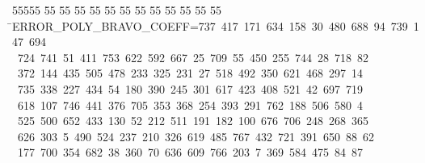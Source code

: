%
%
\begin{tabbing}
55555 \= 55 \= 55 \= 55 \= 55 \= 55 \= 55 \= 55 \= 55 \= 55 \= 55 \= 55 \= 55 \= \>ERROR\_POLY\_BRAVO\_COEFF=737\ 417\ 171\ 634\ 158\ 30\ 480\ 688\ 94\ 739\ 147\ 694\\[0pt]
\>\ 724\ 741\ 51\ 411\ 753\ 622\ 592\ 667\ 25\ 709\ 55\ 450\ 255\ 744\ 28\ 718\ 82\ \\[0pt]
\ 372\ 144\ 435\ 505\ 478\ 233\ 325\ 231\ 27\ 518\ 492\ 350\ 621\ 468\ 297\ 14\\[0pt]
\ 735\ 338\ 227\ 434\ 54\ 180\ 390\ 245\ 301\ 617\ 423\ 408\ 521\ 42\ 697\ 719\ \\[0pt]
\ 618\ 107\ 746\ 441\ 376\ 705\ 353\ 368\ 254\ 393\ 291\ 762\ 188\ 506\ 580\ 4\\[0pt]
\ 525\ 500\ 652\ 433\ 130\ 52\ 212\ 511\ 191\ 182\ 100\ 676\ 706\ 248\ 268\ 365\\[0pt]
\>\ 626\ 303\ 5\ 490\ 524\ 237\ 210\ 326\ 619\ 485\ 767\ 432\ 721\ 391\ 650\ 88\ 62\\[0pt]
\ 177\ 700\ 354\ 682\ 38\ 360\ 70\ 636\ 609\ 766\ 203\ 7\ 369\ 584\ 475\ 84\ 87\\[0pt]

\end{tabbing}
